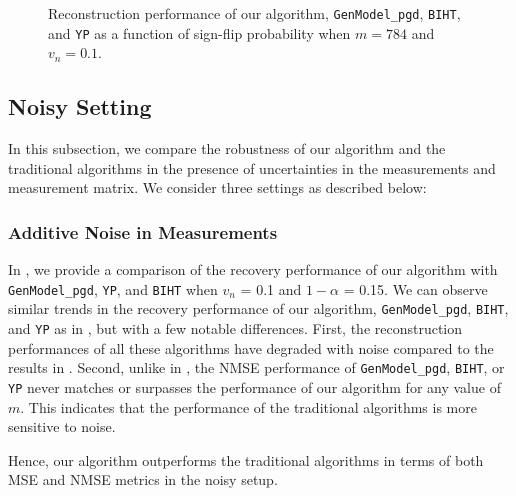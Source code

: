 \documentclass[journal]{IEEEtran}
\begin{document}
\begin{figure}[hptb!]
\caption{Reconstruction performance of our algorithm, \texttt{GenModel\_pgd}, \texttt{BIHT}, and \texttt{YP} as a function of sign-flip probability when $m=784$ and $v_n = 0.1$.}
\label{fig:signerror}
\end{figure}

\subsection{Noisy Setting}
In this subsection, we compare the robustness of our algorithm and the traditional algorithms in the presence of  uncertainties in the measurements and measurement matrix. We consider three settings as described below:


\subsubsection{Additive Noise in Measurements} 
In , we provide a comparison of the recovery performance of our algorithm with \texttt{GenModel\_pgd}, \texttt{YP}, and \texttt{BIHT} when $v_n$ = 0.1 and $1-\alpha$ = 0.15. We can observe similar trends in the recovery performance of our algorithm, \texttt{GenModel\_pgd}, \texttt{BIHT}, and \texttt{YP} as in , but with a few notable differences. First, the reconstruction performances of all these algorithms have degraded with noise compared to the results in . Second, unlike in , the NMSE performance of \texttt{GenModel\_pgd}, \texttt{BIHT},  or  \texttt{YP} never matches or surpasses the performance of our algorithm for any value of $m$. This indicates that the performance of the traditional algorithms is more sensitive to noise. 
 
Hence, our algorithm outperforms the traditional algorithms in terms of both MSE and NMSE metrics in the noisy setup. 
\end{document}
